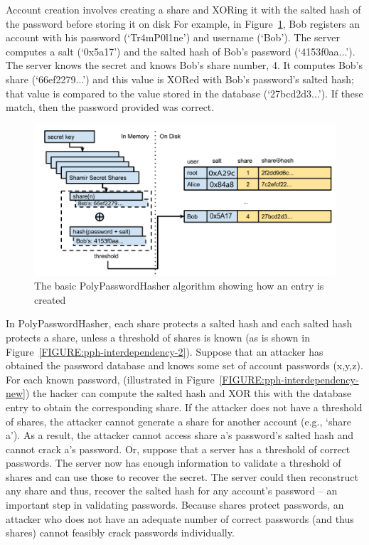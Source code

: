 Account creation involves creating a share and XORing it with
the salted hash of the password before storing it on disk 
For example, in Figure~\ref{FIGURE:basic-pph-algorithm}, Bob registers an
account with his password (`Tr4mP0l1ne') and username (`Bob').  The 
server computes a salt (`0x5a17') and the salted hash of Bob's
password (`4153f0aa...').  The server knows the secret and knows Bob's
share number, 4. It computes Bob's share (`66ef2279...') and this value is XORed
with Bob's password’s salted hash; that value is compared to the value
stored in the database (`27bcd2d3...'). If these match, then the password
provided was correct.

\begin{figure}
    \includegraphics[width=1\linewidth]{./images/basic-pph-algorithm.pdf}
    \caption{The basic PolyPasswordHasher algorithm showing how an entry is created}
    \label{FIGURE:basic-pph-algorithm}
\end{figure}

In PolyPasswordHasher, each share protects a salted hash and each salted hash
protects a share, unless a threshold of shares is known (as is shown in
Figure~\ref{FIGURE:pph-interdependency-2}).  Suppose that an attacker has
obtained the password database and knows some set of account passwords (x,y,z).
For each known password, (illustrated in Figure~\ref{FIGURE:pph-interdependency-new}) 
the hacker can compute the salted hash and XOR this with the database entry to 
obtain the corresponding share.  If the attacker does not have a threshold of shares, 
the attacker cannot generate a share for another account (e.g., `share a').  As a 
result, the attacker cannot access share a's password's salted hash and cannot crack 
a's password.  Or, suppose that a server has a threshold of correct passwords.  
The server now has enough information to validate a threshold of shares and can use those to
recover the secret. The server could then reconstruct any share and thus,
recover the salted hash for any account's password -- an important step in
validating passwords.  Because shares protect passwords, an attacker who does
not have an adequate number of correct passwords (and thus shares) cannot
feasibly crack passwords individually. 


